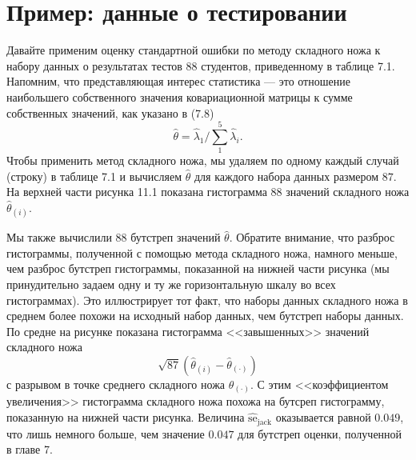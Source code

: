\section{Пример: данные о тестировании}
Давайте применим оценку стандартной ошибки по методу складного ножа к набору данных о результатах тестов $88$ студентов, приведенному в таблице 7.1. Напомним, что представляющая интерес статистика --- это отношение наибольшего собственного значения ковариационной матрицы к сумме собственных значений, как указано в (7.8)
\begin{equation}\label{eq11.12}
    \hat{\theta} = \hat{\lambda}_{1}/\sum\limits_{1}^{5}\hat{\lambda}_{i}.
\end{equation}
Чтобы применить метод складного ножа, мы удаляем по одному каждый случай (строку) в таблице 7.1 и вычисляем $\hat{\theta}$ для каждого набора данных размером $87$. На верхней части рисунка 11.1 показана гистограмма $88$ значений складного ножа $\hat{\theta}_{(i)}$.

Мы также вычислили $88$ бутстреп значений $\hat{\theta}$. Обратите внимание, что разброс гистограммы, полученной с помощью метода складного ножа, намного меньше, чем разброс бутстреп гистограммы, показанной на нижней части рисунка (мы принудительно задаем одну и ту же горизонтальную шкалу во всех гистограммах). Это иллюстрирует тот факт, что наборы данных складного ножа в среднем более похожи на исходный набор данных, чем бутстреп наборы данных. По средне на рисунке показана гистограмма <<завышенных>> значений складного ножа
\begin{equation}\label{eq11.13}
    \sqrt{87}\left(\hat{\theta}_{(i)} - \hat{\theta}_{(\cdot)}\right)
\end{equation}
с разрывом в точке среднего складного ножа $\hat{\theta}_{(\cdot)}$. С этим <<коэффициентом увеличения>> гистограмма складного ножа похожа на бутсреп гистограмму, показанную на нижней части рисунка. Величина $\widehat{\text{se}}_{\text{jack}}$ оказывается равной $0.049$, что лишь немного больше, чем значение $0.047$ для бутстреп оценки, полученной в главе 7.